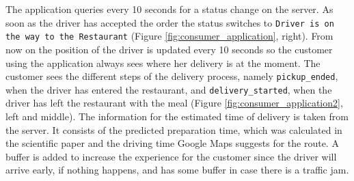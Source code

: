 The application queries every 10 seconds for a status change on the server. As soon as the driver has accepted the order the status switches to \texttt{Driver is on the way to the Restaurant} (Figure \ref{fig:consumer_application}, right). From now on the position of the driver is updated every 10 seconds so the customer using the application always sees where her delivery is at the moment. The customer sees the different steps of the delivery process, namely \texttt{pickup\_ended}, when the driver has entered the restaurant, and \texttt{delivery\_started}, when the driver has left the restaurant with the meal (Figure \ref{fig:consumer_application2}, left and middle). The information for the estimated time of delivery is taken from the server. It consists of the predicted preparation time, which was calculated in the scientific paper and the driving time Google Maps suggests for the route. A buffer is added to increase the experience for the customer since the driver will arrive early, if nothing happens, and has some buffer in case there is a traffic jam.
